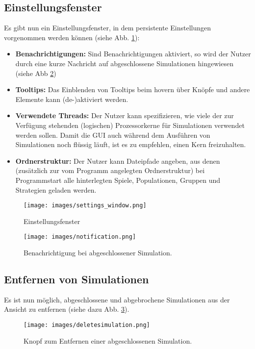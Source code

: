 \documentclass[parskip=full,11pt,openany]{scrreprt}
\begin{document}
\subsection{Einstellungsfenster}\label{sec:settings}
Es gibt nun ein Einstellungsfenster, in dem persistente Einstellungen vorgenommen werden können (siehe Abb. \ref{settings_window}):

\begin{itemize}
\item[] \textbf{Benachrichtigungen:} Sind Benachrichtigungen aktiviert, so wird der Nutzer durch eine kurze Nachricht auf abgeschlossene Simulationen hingewiesen (siehe Abb \ref{notification})
\item[] \textbf{Tooltips:} Das Einblenden von Tooltips beim hovern über Knöpfe und andere Elemente kann (de-)aktiviert werden.
\item[] \textbf{Verwendete Threads:} Der Nutzer kann spezifizieren, wie viele der zur Verfügung stehenden (logischen) Prozessorkerne für Simulationen verwendet werden sollen. Damit die GUI auch während dem Ausführen von Simulationen noch flüssig läuft, ist es zu empfehlen, einen Kern freizuhalten.
\item[] \textbf{Ordnerstruktur:} Der Nutzer kann Dateipfade angeben, aus denen (zusätzlich zur vom Programm angelegten Ordnerstruktur) bei Programmstart alle hinterlegten Spiele, Populationen, Gruppen und Strategien geladen werden.
\end{itemize}

\begin{figure}
	\centering
	\texttt{[image: images/settings\_window.png]}
	\caption{Einstellungsfenster}
	\label{settings_window}
\end{figure}

\begin{figure}
	\centering
	\texttt{[image: images/notification.png]}
	\caption{Benachrichtigung bei abgeschlossener Simulation.}
	\label{notification}
\end{figure}

\subsection{Entfernen von Simulationen}\label{sec:delete}
Es ist nun möglich, abgeschlossene und abgebrochene Simulationen aus der Ansicht zu entfernen (siehe dazu Abb. \ref{deletesimulation}).

\begin{figure}
	\centering
	\texttt{[image: images/deletesimulation.png]}
	\caption{Knopf zum Entfernen einer abgeschlossenen Simulation.}
	\label{deletesimulation}
\end{figure}
\end{document}
